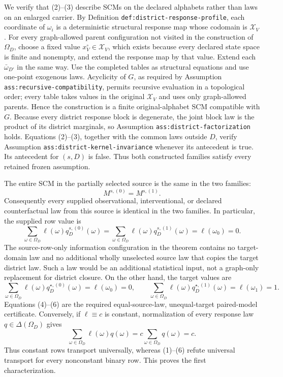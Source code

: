 We verify that (2)--(3) describe SCMs on the declared alphabets rather than laws on an enlarged carrier.  By Definition \texttt{def:district-response-profile}, each coordinate of \(\omega_i\) is a deterministic structural response map whose codomain is \(\mathcal X_V\).  For every graph-allowed parent configuration not visited in the construction of \(\Omega_D\), choose a fixed value \(x_V^\circ\in\mathcal X_V\), which exists because every declared state space is finite and nonempty, and extend the response map by that value.  Extend each \(\bar\omega_{D'}\) in the same way.  Use the completed tables as structural equations and use one-point exogenous laws.  Acyclicity of \(G\), as required by Assumption \texttt{ass:recursive-compatibility}, permits recursive evaluation in a topological order; every table takes values in the original \(\mathcal X_V\) and uses only graph-allowed parents.  Hence the construction is a finite original-alphabet SCM compatible with \(G\).  Because every district response block is degenerate, the joint block law is the product of its district marginals, so Assumption \texttt{ass:district-factorization} holds.  Equations (2)--(3), together with the common laws outside \(D\), verify Assumption \texttt{ass:district-kernel-invariance} whenever its antecedent is true.  Its antecedent for \((s,D)\) is false.  Thus both constructed families satisfy every retained frozen assumption.

The entire SCM in the partially selected source is the same in the two families:
\[
M^{s,(0)}=M^{s,(1)}.
\tag{4}
\]
Consequently every supplied observational, interventional, or declared counterfactual law from this source is identical in the two families.  In particular, the supplied row value is
\[
\sum_{\omega\in\Omega_D}\ell(\omega)q_D^{s,(0)}(\omega)
=
\sum_{\omega\in\Omega_D}\ell(\omega)q_D^{s,(1)}(\omega)
=\ell(\omega_0)=0.
\tag{5}
\]
The source-row-only information configuration in the theorem contains no target-domain law and no additional wholly unselected source law that copies the target district law.  Such a law would be an additional statistical input, not a graph-only replacement for district closure.  On the other hand, the target values are
\[
\sum_{\omega\in\Omega_D}\ell(\omega)q_D^{\star,(0)}(\omega)
=\ell(\omega_0)=0,
\qquad
\sum_{\omega\in\Omega_D}\ell(\omega)q_D^{\star,(1)}(\omega)
=\ell(\omega_1)=1.
\tag{6}
\]
Equations (4)--(6) are the required equal-source-law, unequal-target paired-model certificate.  Conversely, if \(\ell\equiv c\) is constant, normalization of every response law \(q\in\Delta(\Omega_D)\) gives
\[
\sum_{\omega\in\Omega_D}\ell(\omega)q(\omega)
=c\sum_{\omega\in\Omega_D}q(\omega)=c.
\tag{7}
\]
Thus constant rows transport universally, whereas (1)--(6) refute universal transport for every nonconstant binary row.  This proves the first characterization.

